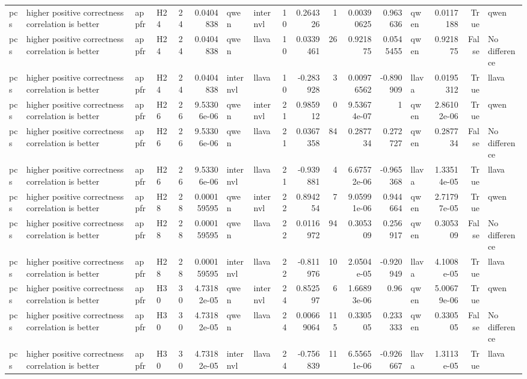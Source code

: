\begin{longtable}{llllrrllrrrrrlrrl}
pcs & higher positive correctness correlation is better & appfr & H24 & 24 & 0.0404838 & qwen & internvl & 10 & 0.264326 & 1 & 0.00390625 & 0.963636 & qwen & 0.0117188 & True & qwen \\
pcs & higher positive correctness correlation is better & appfr & H24 & 24 & 0.0404838 & qwen & llava & 10 & 0.0339461 & 26 & 0.921875 & 0.0545455 & qwen & 0.921875 & False & No difference \\
pcs & higher positive correctness correlation is better & appfr & H24 & 24 & 0.0404838 & internvl & llava & 10 & -0.283928 & 3 & 0.00976562 & -0.890909 & llava & 0.0195312 & True & llava \\
pcs & higher positive correctness correlation is better & appfr & H26 & 26 & 9.53306e-06 & qwen & internvl & 21 & 0.985912 & 0 & 9.53674e-07 & 1 & qwen & 2.86102e-06 & True & qwen \\
pcs & higher positive correctness correlation is better & appfr & H26 & 26 & 9.53306e-06 & qwen & llava & 21 & 0.0367358 & 84 & 0.287734 & 0.272727 & qwen & 0.287734 & False & No difference \\
pcs & higher positive correctness correlation is better & appfr & H26 & 26 & 9.53306e-06 & internvl & llava & 21 & -0.939881 & 4 & 6.67572e-06 & -0.965368 & llava & 1.33514e-05 & True & llava \\
pcs & higher positive correctness correlation is better & appfr & H28 & 28 & 0.000159595 & qwen & internvl & 22 & 0.894254 & 7 & 9.05991e-06 & 0.944664 & qwen & 2.71797e-05 & True & qwen \\
pcs & higher positive correctness correlation is better & appfr & H28 & 28 & 0.000159595 & qwen & llava & 22 & 0.0116972 & 94 & 0.305309 & 0.256917 & qwen & 0.305309 & False & No difference \\
pcs & higher positive correctness correlation is better & appfr & H28 & 28 & 0.000159595 & internvl & llava & 22 & -0.811976 & 10 & 2.0504e-05 & -0.920949 & llava & 4.1008e-05 & True & llava \\
pcs & higher positive correctness correlation is better & appfr & H30 & 30 & 4.73182e-05 & qwen & internvl & 24 & 0.852597 & 6 & 1.66893e-06 & 0.96 & qwen & 5.00679e-06 & True & qwen \\
pcs & higher positive correctness correlation is better & appfr & H30 & 30 & 4.73182e-05 & qwen & llava & 24 & 0.00669064 & 115 & 0.330505 & 0.233333 & qwen & 0.330505 & False & No difference \\
pcs & higher positive correctness correlation is better & appfr & H30 & 30 & 4.73182e-05 & internvl & llava & 24 & -0.756839 & 11 & 6.55651e-06 & -0.926667 & llava & 1.3113e-05 & True & llava \\

\end{longtable}

